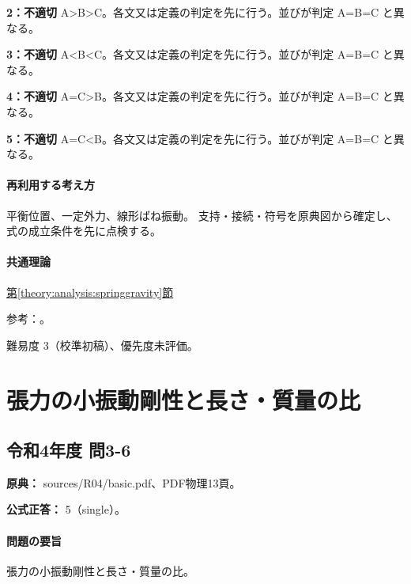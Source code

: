\noindent\textbf{2：不適切} A>B>C。各文又は定義の判定を先に行う。並びが判定 A=\allowbreak{}B=\allowbreak{}C と異なる。\par

\noindent\textbf{3：不適切} A<B<C。各文又は定義の判定を先に行う。並びが判定 A=\allowbreak{}B=\allowbreak{}C と異なる。\par

\noindent\textbf{4：不適切} A=\allowbreak{}C>B。各文又は定義の判定を先に行う。並びが判定 A=\allowbreak{}B=\allowbreak{}C と異なる。\par

\noindent\textbf{5：不適切} A=\allowbreak{}C<B。各文又は定義の判定を先に行う。並びが判定 A=\allowbreak{}B=\allowbreak{}C と異なる。\par

\paragraph{再利用する考え方} 平衡位置、一定外力、線形ばね振動。 支持・接続・符号を原典図から確定し、式の成立条件を先に点検する。

\paragraph{共通理論} \hyperref[theory:analysis:springgravity]{第\ref*{theory:analysis:springgravity}節}

\par 参考：\cite{analysis57_shm}。

\par 難易度 3（校準初稿）、優先度未評価。

\section{張力の小振動剛性と長さ・質量の比}

\subsection{令和4年度 問3-6}
\label{q:r04-reg-basic-3-6}

\noindent\textbf{原典：} sources/R04/basic.pdf、PDF物理13頁。

\textbf{公式正答：} 5（single）。

\paragraph{問題の要旨} 張力の小振動剛性と長さ・質量の比。

